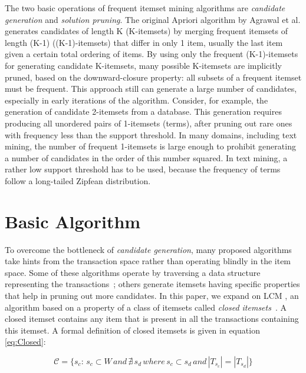 \documentclass{sig-alternate}
\begin{document}
The two basic operations of frequent itemset mining algorithms are
\emph{candidate generation} and \emph{solution pruning}.
The original Apriori algorithm by Agrawal et al. \cite{agrawal1994fast}
generates candidates of length K (K-itemsets) by merging frequent itemsets of
length (K-1) ((K-1)-itemsets) that differ in only 1 item, usually the last
item given a certain total ordering of items.
By using only the frequent  (K-1)-itemsets for generating candidate K-itemsets,
many possible K-itemsets are implicitly pruned, based on the downward-closure property:
all subsets of a frequent itemset must be frequent.
This approach still can generate a large number of candidates, especially
in early iterations of the algorithm.
Consider, for example, the generation of candidate 2-itemsets from a database.
This generation requires producing all unordered pairs of 1-itemsets (terms),
after pruning out rare ones with frequency less than the support threshold.
In many domains, including text mining, the number of frequent 1-itemsets is
large enough to prohibit generating a number of candidates in the order of this
number squared.
In text mining, a rather low support threshold has to be used, because the
frequency of terms follow a long-tailed Zipfean distribution.

\section{Basic Algorithm}
\label{sec:lcm}
To overcome the bottleneck of \emph{candidate generation}, many proposed
algorithms take hints from the transaction space rather than operating blindly
in the item space.
Some of these algorithms operate by traversing a data structure representing
the transactions~\cite{han2000mining}; others generate itemsets having
specific properties that help in pruning out more candidates.
In this paper, we expand on LCM \cite{uno2004lcm}, an algorithm based on a
property of a class of itemsets called
\emph{closed itemsets}~\cite{pasquier1999discovering}.
A closed itemset contains any item that is present in all the transactions
containing this itemset.
A formal definition of closed itemsets is given in equation \ref{eq:Closed}: 

\begin{equation}\label{eq:Closed}\mathcal{C} = \{s_c:\, s_c \subset W \, and \,\nexists \, s_d \, where \, s_c  \subset s_d \, and \, |T_{s_c}| = |T_{s_d}|\}\end{equation}
\end{document}
